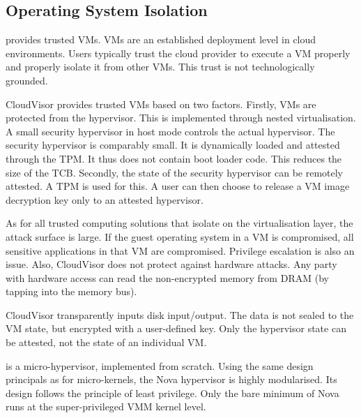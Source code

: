 \subsection{Operating System Isolation\label{ID_1279358890}}
\begin{description}\label{ID_1149112575}
\item[CloudVisor\cite{Zhang2011}]\label{ID_1588951554}
provides trusted VMs.\label{ID_1095393821}
VMs are an established deployment level in cloud environments.\label{ID_44643707}
Users typically trust the cloud provider to execute a VM properly and properly isolate it from other VMs. This trust is not technologically grounded.\label{ID_96896603}

CloudVisor provides trusted VMs based on two factors.\label{ID_661635791}
Firstly, VMs are protected from the hypervisor. This is implemented through nested virtualisation. A small security hypervisor in host mode controls the actual hypervisor.\label{ID_514198549}
The security hypervisor is comparably small. It is dynamically loaded and attested through the TPM. It thus does not contain boot loader code. This reduces the size of the TCB.\label{ID_926319613}
Secondly, the state of the security hypervisor can be remotely attested. A TPM is used for this. A user can then choose to release a VM image decryption key only to an attested hypervisor.\label{ID_175981473}

As for all trusted computing solutions that isolate on the virtualisation layer, the attack surface is large. If the guest operating system in a VM is compromised, all sensitive applications in that VM are compromised. Privilege escalation is also an issue.\label{ID_1893397931}
Also, CloudVisor does not protect against hardware attacks. Any party with hardware access can read the non-encrypted memory from DRAM (by tapping into the memory bus).\label{ID_791021042}

CloudVisor transparently inputs disk input/output.\label{ID_1740019798}
The data is not sealed to the VM state, but encrypted with a user-defined key.\label{ID_203575878}
Only the hypervisor state can be attested, not the state of an individual VM.\label{ID_1959689941}
\item[Nova\cite{Steinberg2010}]\label{ID_61001884}
is a micro-hypervisor, implemented from scratch.\label{ID_1979954588}
Using the same design principals as for micro-kernels, the Nova hypervisor is highly modularised.\label{ID_1097579055}
Its design follows the principle of least privilege.\label{ID_786963966}
Only the bare minimum of Nova runs at the super-privileged VMM kernel level.\label{ID_844682668}


\end{description}
